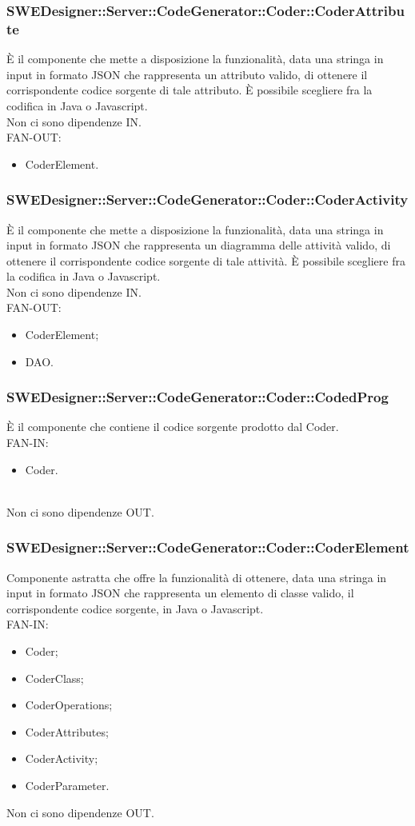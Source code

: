 \documentclass[../PianoDiQualifica.tex]{subfiles}
\begin{document}
			\subsubsection{SWEDesigner::Server::CodeGenerator::Coder::CoderAttribute}
			È il componente che mette a disposizione la funzionalità, data una stringa in input in formato JSON che rappresenta un attributo valido, di ottenere il corrispondente codice sorgente di tale attributo. È possibile scegliere fra la codifica in Java o Javascript.\\
			Non ci sono dipendenze IN.\\
			FAN-OUT:
			\begin{itemize}
				\item CoderElement.
			\end{itemize}
		\subsubsection{SWEDesigner::Server::CodeGenerator::Coder::CoderActivity}
		È il componente che mette a disposizione la funzionalità, data una stringa in input in formato JSON che rappresenta un diagramma delle attività valido, di ottenere il corrispondente codice sorgente di tale attività. È possibile scegliere fra la codifica in Java o Javascript.\\
		Non ci sono dipendenze IN.\\
		FAN-OUT:
		\begin{itemize}
			\item CoderElement;
			\item DAO.
		\end{itemize}
		\subsubsection{SWEDesigner::Server::CodeGenerator::Coder::CodedProg}
		È il componente che contiene il codice sorgente prodotto dal Coder.\\
		FAN-IN:
		\begin{itemize}
			\item Coder.
		\end{itemize}\\
		Non ci sono dipendenze OUT.
		
		\subsubsection{SWEDesigner::Server::CodeGenerator::Coder::CoderElement}
		Componente astratta che offre la funzionalità di ottenere, data una stringa in input in formato JSON che rappresenta un elemento di classe valido, il corrispondente codice sorgente, in Java o Javascript.\\
		FAN-IN:
		\begin{itemize}
			\item Coder;
			\item CoderClass;
			\item CoderOperations;
			\item CoderAttributes;
			\item CoderActivity;
			\item CoderParameter.
		\end{itemize}
		Non ci sono dipendenze OUT.
\end{document}
